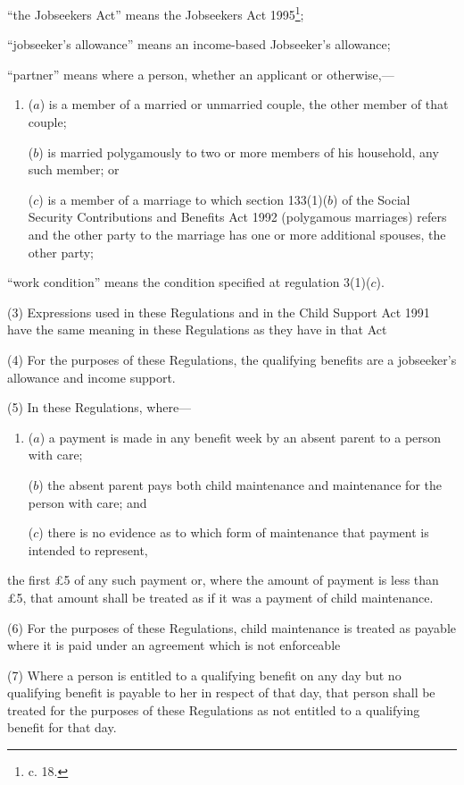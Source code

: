 \documentclass[a4paper]{article}
\begin{document}
\begin{enumerate}
“the Jobseekers Act” means the Jobseekers Act 1995\footnote{ c. 18.};

“jobseeker’s allowance” means an income-based Jobseeker’s allowance;

“partner” means where a person, whether an applicant or otherwise,—
\begin{enumerate}\item[]
($a$) is a member of a married or unmarried couple, the other member of that couple;

($b$) is married polygamously to two or more members of his household, any such member; or

($c$) is a member of a marriage to which section 133(1)($b$) of the Social Security Contributions and Benefits Act 1992 (polygamous marriages) refers and the other party to the marriage has one or more additional spouses, the other party;
\end{enumerate}

“work condition” means the condition specified at regulation 3(1)($c$).
\end{enumerate}

(3) Expressions used in these Regulations and in the Child Support Act 1991 have the same meaning in these Regulations as they have in that Act

(4) For the purposes of these Regulations, the qualifying benefits are a jobseeker’s allowance and income support.

(5) In these Regulations, where—
\begin{enumerate}\item[]
($a$) a payment is made in any benefit week by an absent parent to a person with care;

($b$) the absent parent pays both child maintenance and maintenance for the person with care; and

($c$) there is no evidence as to which form of maintenance that payment is intended to represent,
\end{enumerate}
the first £5 of any such payment or, where the amount of payment is less than £5, that amount shall be treated as if it was a payment of child maintenance.

(6) For the purposes of these Regulations, child maintenance is treated as payable where it is paid under an agreement which is not enforceable

(7) Where a person is entitled to a qualifying benefit on any day but no qualifying benefit is payable to her in respect of that day, that person shall be treated for the purposes of these Regulations as not entitled to a qualifying benefit for that day.
\end{document}
